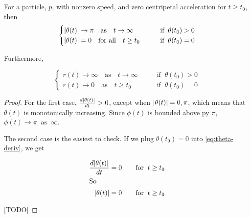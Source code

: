 \begin{lemma}\label{lemma:polar-assymptote}
  For a particle, $p$, with nonzero speed, and zero centripetal acceleration for $t \ge t_0$, then
  \[
    \begin{cases}
      \abs{\theta(t)} \to \pi \quad \text{as} \quad t \to \infty \qquad &\text{if} \;\; \theta(t_0) > 0\\
      \abs{\theta(t)} = 0 \quad \text{for all} \quad t \ge t_0 \qquad &\text{if} \;\; \theta(t_0) = 0
    \end{cases}
  \]

    Furthermore,

  \[
    \begin{cases}
      r(t) \to \infty \quad \text{as} \quad t \to \infty \qquad &\text{if} \;\; \theta(t_0) > 0\\
      r(t) \to 0 \quad \text{as} \quad t \ge t_0 \qquad &\text{if} \;\; \theta(t_0) = 0
    \end{cases}
  \]
\end{lemma}

\begin{proof}

For the first case, $\frac{d\abs{\theta(t)}}{dt} > 0$, except when $\abs{\theta(t)} = 0, \pi$, which means that $\theta(t)$ is monotonically increasing. Since $\phi(t)$ is bounded above py $\pi$, $\phi(t) \to \pi \;\; \text{as} \;\; \infty$.

The second case is the easiest to check. If we plug $\theta(t_0) = 0$ into \ref{eq:theta-deriv}, we get

\begin{align*}
\frac{d\abs{\theta(t)}}{dt} = 0 \qquad \text{for} \;\; t \ge t_0\\
\intertext{So}
\abs{\theta(t)} = 0 \qquad \text{for} \;\; t \ge t_0
\end{align*}

[TODO]

\end{proof}